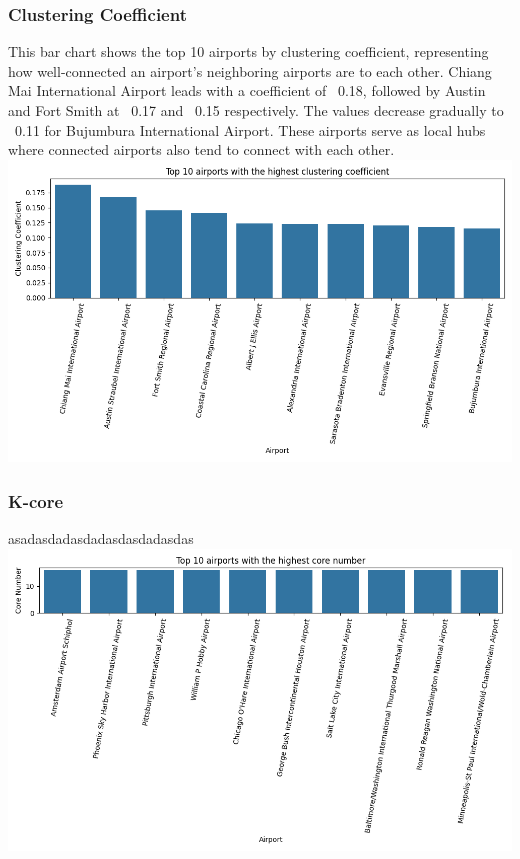 \documentclass[12pt]{article}
\begin{document}
\begin{minipage}{\textwidth}
    \subsubsection{Clustering Coefficient}
   {This bar chart shows the top 10 airports by clustering coefficient, representing how well-connected an airport's neighboring airports are to each other. Chiang Mai International Airport leads with a coefficient of ~0.18, followed by Austin and Fort Smith at ~0.17 and ~0.15 respectively. The values decrease gradually to ~0.11 for Bujumbura International Airport. These airports serve as local hubs where connected airports also tend to connect with each other.}
    \centering
    \includegraphics[width=1\linewidth]{img/clustering_coefficient.png}
\end{minipage}

\begin{minipage}{\textwidth}
    \subsubsection{K-core}
    {asadasdadasdadasdasdadasdas}
    \centering
    \includegraphics[width=1\linewidth]{img/core_number.png}
\end{minipage}
\end{document}
